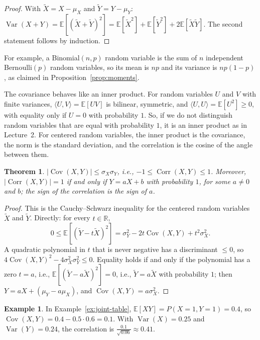 \documentclass[11pt]{article}
\newcommand{\ip}[2]{\langle #1, #2 \rangle}
\newcommand{\E}{\mathbb{E}}
\DeclareMathOperator{\Var}{Var}
\DeclareMathOperator{\Cov}{Cov}
\DeclareMathOperator{\Corr}{Corr}
\theoremstyle{definition}
\newtheorem{example}[definition]{Example}
\theoremstyle{plain}
\newtheorem{theorem}[definition]{Theorem}
\theoremstyle{remark}
\begin{document}
\begin{proof}
    With $\tilde X = X - \mu_X$ and $\tilde Y = Y - \mu_Y$: $\Var(X + Y) = \E[(\tilde X + \tilde Y)^2] = \E[\tilde X^2] + \E[\tilde Y^2] + 2\E[\tilde X\tilde Y]$. The second statement follows by induction.
\end{proof}

For example, a Binomial$(n, p)$ random variable is the sum of $n$ independent Bernoulli$(p)$ random variables, so its mean is $np$ and its variance is $np(1 - p)$, as claimed in Proposition~\ref{prop:moments}.

The covariance behaves like an inner product. For random variables $U$ and $V$ with finite variances, $\ip{U}{V} = \E[UV]$ is bilinear, symmetric, and $\ip{U}{U} = \E[U^2] \geq 0$, with equality only if $U = 0$ with probability $1$. So, if we do not distinguish random variables that are equal with probability $1$, it is an inner product as in Lecture~2. For centered random variables, the inner product is the covariance, the norm is the standard deviation, and the correlation is the cosine of the angle between them.

\begin{theorem}\label{thm:correlation}
    $|\Cov(X, Y)| \leq \sigma_X\sigma_Y$, i.e., $-1 \leq \Corr(X, Y) \leq 1$. Moreover, $|\Corr(X, Y)| = 1$ if and only if $Y = aX + b$ with probability $1$, for some $a \neq 0$ and $b$; the sign of the correlation is the sign of $a$.
\end{theorem}

\begin{proof}
    This is the Cauchy--Schwarz inequality for the centered random variables $\tilde X$ and $\tilde Y$. Directly: for every $t \in \mathbb{R}$,
    \[0 \leq \E[(\tilde Y - t\tilde X)^2] = \sigma_Y^2 - 2t\Cov(X, Y) + t^2\sigma_X^2.\]
    A quadratic polynomial in $t$ that is never negative has a discriminant $\leq 0$, so $4\Cov(X, Y)^2 - 4\sigma_X^2\sigma_Y^2 \leq 0$. Equality holds if and only if the polynomial has a zero $t = a$, i.e., $\E[(\tilde Y - a\tilde X)^2] = 0$, i.e., $\tilde Y = a\tilde X$ with probability $1$; then $Y = aX + (\mu_Y - a\mu_X)$, and $\Cov(X, Y) = a\sigma_X^2$.
\end{proof}

\begin{example}\label{ex:joint-cov}
    In Example~\ref{ex:joint-table}, $\E[XY] = P(X = 1, Y = 1) = 0.4$, so $\Cov(X, Y) = 0.4 - 0.5 \cdot 0.6 = 0.1$. With $\Var(X) = 0.25$ and $\Var(Y) = 0.24$, the correlation is $\frac{0.1}{\sqrt{0.06}} \approx 0.41$.
\end{example}
\end{document}

